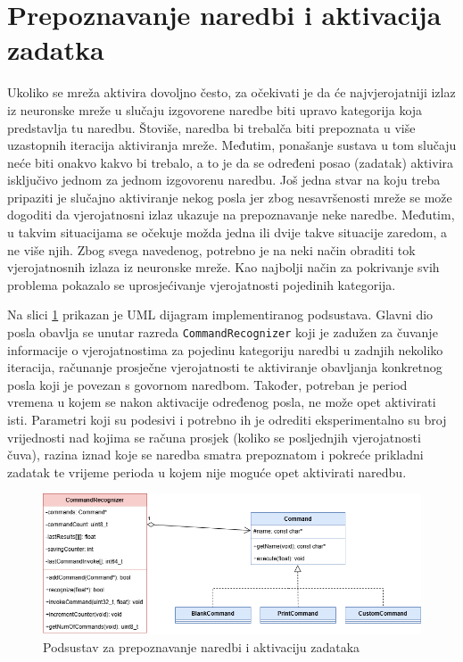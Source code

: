 \section{Prepoznavanje naredbi i aktivacija zadatka}
\label{sec:prepoy}

Ukoliko se mreža aktivira dovoljno često, za očekivati je da će najvjerojatniji izlaz iz 
neuronske mreže u slučaju izgovorene naredbe biti upravo kategorija koja predstavlja tu naredbu. 
Štoviše, naredba bi trebalča biti prepoznata u više uzastopnih iteracija aktiviranja mreže.
Međutim, ponašanje sustava u tom slučaju neće biti onakvo kakvo bi trebalo, a to je da se
određeni posao (zadatak) aktivira isključivo jednom za jednom izgovorenu naredbu. 
Još jedna stvar na koju treba pripaziti je slučajno aktiviranje nekog posla jer zbog
nesavršenosti mreže se može dogoditi da vjerojatnosni izlaz ukazuje na prepoznavanje neke
naredbe. Međutim, u takvim situacijama se očekuje možda jedna ili dvije takve situacije zaredom,
a ne više njih. Zbog svega navedenog, potrebno je na neki način obraditi tok vjerojatnosnih
izlaza iz neuronske mreže. Kao najbolji način za pokrivanje svih problema pokazalo se 
uprosjećivanje vjerojatnosti pojedinih kategorija. 

Na slici \ref{pic:uml} prikazan je UML dijagram implementiranog podsustava. Glavni dio posla
obavlja se unutar razreda \texttt{CommandRecognizer} koji je zadužen za čuvanje informacije
o vjerojatnostima za pojedinu kategoriju naredbi u zadnjih nekoliko iteracija, računanje
prosječne vjerojatnosti te aktiviranje obavljanja konkretnog posla koji je povezan s govornom
naredbom. Također, potreban je period vremena u kojem se nakon aktivacije određenog
posla, ne može opet aktivirati isti. Parametri koji su podesivi i potrebno ih je odrediti 
eksperimentalno su broj vrijednosti nad kojima se računa prosjek (koliko se posljednjih
vjerojatnosti čuva), razina iznad koje se naredba smatra prepoznatom i pokreće prikladni zadatak
te vrijeme perioda u kojem nije moguće opet aktivirati naredbu. 

\begin{figure}[htb]
    \centering
    \includegraphics[width=0.8\linewidth]{Chapters/struktura_sustava/prepoznavanje_naredbi/commands.png} 
    \caption{Podsustav za prepoznavanje naredbi i aktivaciju zadataka\cite{flowchart}}
    \label{pic:uml}
\end{figure}

